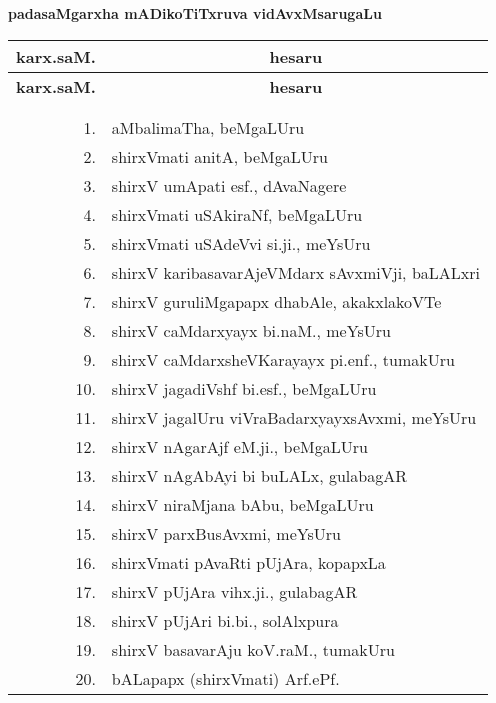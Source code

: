 \begin{center}
{\large\bf padasaMgarxha mADikoTiTxruva vidAvxMsarugaLu}

\thispagestyle{empty}

\lhead[]{}
\rhead[]{}

\begin{minipage}[t]{7cm}
{\renewcommand{\arraystretch}{1.5}
\begin{longtable}{rl}
\hline
{\bf karx.saM.} & \multicolumn{1}{c}{\bf hesaru}\\[3pt]
\hline
\endfirsthead
\hline
{\bf karx.saM.} & \multicolumn{1}{c}{\bf hesaru}\\[3pt]
\hline
  & \\[-10pt]
\endhead
\endfoot
\endlastfoot
  & \\[-15pt]
1. & aMbalimaTha, beMgaLUru\\
2. & shirxVmati anitA, beMgaLUru\\
3. & shirxV  umApati esf., dAvaNagere\\
4. & shirxVmati uSAkiraNf, beMgaLUru\\
5. & shirxVmati uSAdeVvi si.ji., meYsUru\\
6. & shirxV karibasavarAjeVMdarx sAvxmiVji, baLALxri\\
7. & shirxV guruliMgapapx dhabAle, akakxlakoVTe\\
8. & shirxV caMdarxyayx bi.naM., meYsUru\\
9. & shirxV  caMdarxsheVKarayayx pi.enf., tumakUru\\
10. & shirxV jagadiVshf bi.esf., beMgaLUru\\
11. & shirxV jagalUru viVraBadarxyayxsAvxmi, meYsUru\\
12. & shirxV nAgarAjf eM.ji., beMgaLUru\\
13. &  shirxV nAgAbAyi bi buLALx, gulabagAR\\
14. & shirxV niraMjana bAbu, beMgaLUru\\
15. & shirxV parxBusAvxmi, meYsUru\\
16. & shirxVmati pAvaRti pUjAra, kopapxLa\\
17. & shirxV pUjAra vihx.ji., gulabagAR\\
18. & shirxV  pUjAri bi.bi., solAlxpura\\
19. & shirxV  basavarAju koV.raM., tumakUru\\
20. & bALapapx (shirxVmati) Arf.ePf.

\end{longtable}}
\end{minipage}
\end{center}
